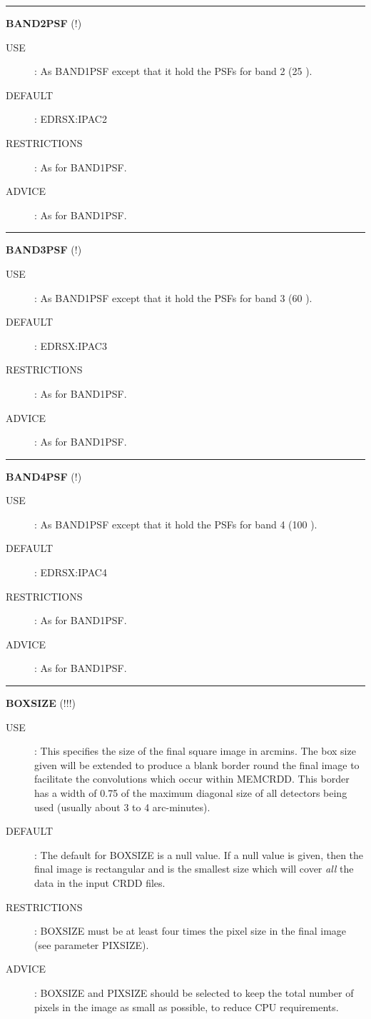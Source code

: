 \rule{\textwidth}{0.3mm}
{\Large {\bf BAND2PSF} (!)}
\begin{description}
\item [USE]:
As BAND1PSF except that it hold the PSFs for band 2 (25 \micron).
\item [DEFAULT]:
EDRSX:IPAC2
\item [RESTRICTIONS]:
As for BAND1PSF.
\item [ADVICE]:
As for BAND1PSF.
\end {description}

\rule{\textwidth}{0.3mm}
{\Large {\bf BAND3PSF} (!)}
\begin{description}
\item [USE]:
As BAND1PSF except that it hold the PSFs for band 3 (60 \micron).
\item [DEFAULT]:
EDRSX:IPAC3
\item [RESTRICTIONS]:
As for BAND1PSF.
\item [ADVICE]:
As for BAND1PSF.
\end {description}

\rule{\textwidth}{0.3mm}
{\Large {\bf BAND4PSF} (!)}
\begin{description}
\item [USE]:
As BAND1PSF except that it hold the PSFs for band 4 (100 \micron).
\item [DEFAULT]:
EDRSX:IPAC4
\item [RESTRICTIONS]:
As for BAND1PSF.
\item [ADVICE]:
As for BAND1PSF.
\end {description}


\rule{\textwidth}{0.3mm}
{\Large {\bf BOXSIZE} (!!!)}
\begin{description}
\item [USE]:
This specifies the size of the final square image in arcmins. The box size given
will be extended to produce a blank border round the final image to facilitate
the convolutions which occur within MEMCRDD. This border has a width of 0.75 of
the maximum diagonal size of all detectors being used (usually about 3 to 4
arc-minutes).
\item [DEFAULT]:
The default for BOXSIZE is a null value. If a null value is given, then the
final image is rectangular and is the smallest size which will cover {\em all}
the data in the input CRDD files.
\item [RESTRICTIONS]:
BOXSIZE must be at least four times the pixel size in the final image (see
parameter PIXSIZE).
\item [ADVICE]:
BOXSIZE and PIXSIZE should be selected to keep the total number of pixels in the
image as small as possible, to reduce CPU requirements.
\end {description}

